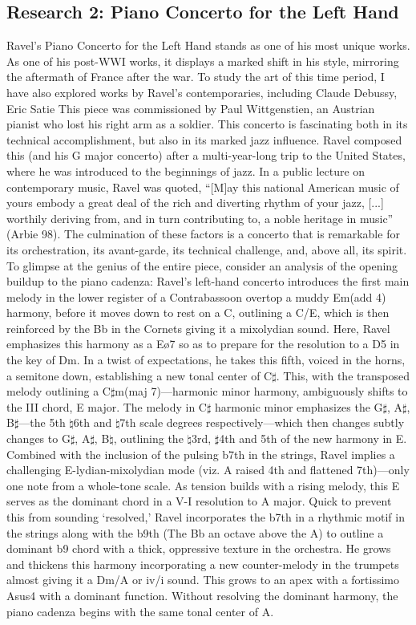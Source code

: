 \documentclass[11pt,a4paper]{article}
\begin{document}
\subsection{Research 2: Piano Concerto for the Left Hand}

Ravel’s Piano Concerto for the Left Hand stands as one of his most unique works. As one of his post-WWI works, it displays a marked shift in his style, mirroring the aftermath of France after the war. To study the art of this time period, I have also explored works by Ravel's contemporaries, including Claude Debussy, Eric Satie This piece was commissioned by Paul Wittgenstien, an Austrian pianist who lost his right arm as a soldier.\autocite[100]{Orenstein} This concerto is fascinating both in its technical accomplishment, but also in its marked jazz influence. Ravel composed this (and his G major concerto) after a multi-year-long trip to the United States, where he was introduced to the beginnings of jazz. In a public lecture on contemporary music, Ravel was quoted, “[M]ay this national American music of yours embody a great deal of the rich and diverting rhythm of your jazz, [...] worthily deriving from, and in turn contributing to, a noble heritage in music” (Arbie 98). The culmination of these factors is a concerto that is remarkable for its orchestration, its avant-garde, its technical challenge, and, above all, its spirit.
 To glimpse at the genius of the entire piece, consider an analysis of the opening buildup to the piano cadenza: Ravel’s left-hand concerto introduces the first main melody in the lower register of a Contrabassoon overtop a muddy Em(add 4) harmony, before it moves down to rest on a C, outlining a C/E, which is then reinforced by the Bb in the Cornets giving it a mixolydian sound. Here, Ravel emphasizes this harmony as a Eø7 so as to prepare for the resolution to a D5 in the key of Dm. In a twist of expectations, he takes this fifth, voiced in the horns, a semitone down, establishing a new tonal center of C$\sharp$. This, with the transposed melody outlining a C$\sharp$m(maj 7)—harmonic minor harmony, ambiguously shifts to the III chord, E major. The melody in C$\sharp$ harmonic minor emphasizes the G$\sharp$, A$\sharp$, B$\sharp$—the 5th $\natural$6th and $\natural$7th scale degrees respectively—which then changes subtly changes to G$\sharp$, A$\sharp$, B$\natural$, outlining the $\natural$3rd, $\sharp$4th and 5th of the new harmony in E. Combined with the inclusion of the pulsing b7th in the strings, Ravel implies a challenging E-lydian-mixolydian mode (viz. A raised 4th and flattened 7th)—only one note from a whole-tone scale. As tension builds with a rising melody, this E serves as the dominant chord in a V-I resolution to A major. Quick to prevent this from sounding ‘resolved,’ Ravel incorporates the b7th in a rhythmic motif in the strings along with the b9th (The Bb an octave above the A) to outline a dominant b9 chord with a thick, oppressive texture in the orchestra. He grows and thickens this harmony incorporating a new counter-melody in the trumpets almost giving it a Dm/A or iv/i sound. This grows to an apex with a fortissimo Asus4 with a dominant function. Without resolving the dominant harmony, the piano cadenza begins with the same tonal center of A.\autocite{ravel}
\end{document}
